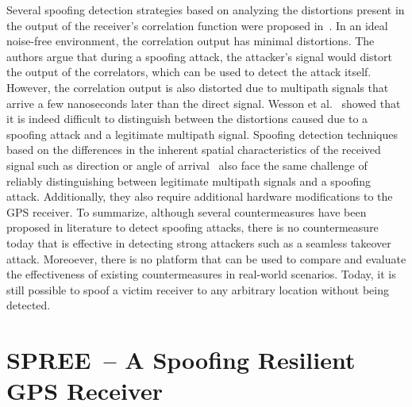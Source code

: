 \documentclass[letterpaper,twocolumn,10pt]{article}
\newcommand{\rxname}{SPREE\xspace}
\begin{document}
Several spoofing detection strategies based on analyzing the distortions present in the output of the receiver's correlation function were proposed in~\cite{Wesson2011,phelts2001multicorrelator}. In an ideal noise-free environment, the correlation output has minimal distortions. The authors argue that during a spoofing attack, the attacker's signal would distort the output of the correlators, which can be used to detect the attack itself. However, the correlation output is also distorted due to multipath signals that arrive a few nanoseconds later than the direct signal. Wesson et al.~\cite{Wesson2011} showed that it is indeed difficult to distinguish between the distortions caused due to a spoofing attack and a legitimate multipath signal. Spoofing detection techniques based on the differences in the inherent spatial characteristics of the received signal such as direction or angle of arrival~\cite{Montgomery2009,Psiaki2011,broumandan2012gnss} also face the same challenge of reliably distinguishing between legitimate multipath signals and a spoofing attack. Additionally, they also require additional hardware modifications to the GPS receiver. To summarize, although several countermeasures have been proposed in literature to detect spoofing attacks, there is no countermeasure today that is effective in detecting strong attackers such as a seamless takeover attack. Moreoever, there is no platform that can be used to compare and evaluate the effectiveness of existing countermeasures in real-world scenarios. Today, it is still possible to spoof a victim receiver to any arbitrary location without being detected.


\section{\rxname~-- A Spoofing Resilient GPS Receiver}
\label{sec:spoofing-aware-gps-receiver}
\end{document}
